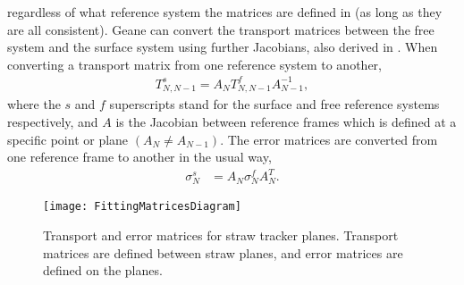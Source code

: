regardless of what reference system the matrices are defined in (as long as they are all consistent). Geane can convert the transport matrices between the free system and the surface system using further Jacobians, also derived in . When converting a transport matrix from one reference system to another,
    \begin{align} \label{eq:Ttransform}
        T_{N,N-1}^{s} = A_{N} T_{N,N-1}^{f} A_{N-1}^{-1},
    \end{align}
where the $s$ and $f$ superscripts stand for the surface and free reference systems respectively, and $A$ is the Jacobian between reference frames which is defined at a specific point or plane $(A_{N} \neq A_{N-1})$. The error matrices are converted from one reference frame to another in the usual way, 
    \begin{align} \label{eq:Sigtransform}
        \sigma_{N}^{s} &= A_{N} \sigma_{N}^{f} A_{N}^{T}.
    \end{align}


\begin{figure}
  \centering
  \texttt{[image: FittingMatricesDiagram]}
    \caption[Transport and error matrices for straw tracker planes]{Transport and error matrices for straw tracker planes. Transport matrices are defined between straw planes, and error matrices are defined on the planes.}
    \label{fig:FittingMatricesDiagram}
\end{figure}



